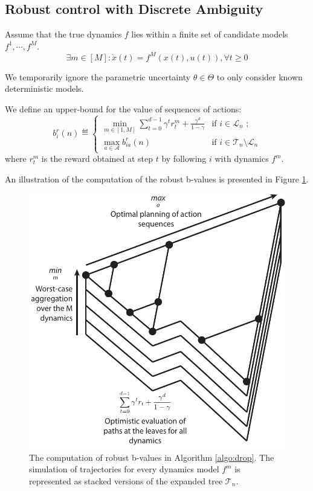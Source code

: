 \documentclass{article}
\begin{document}
\subsection{Robust control with Discrete Ambiguity}


\begin{assumption}
Assume that the true dynamics $f$ lies within a finite set of candidate models $f^1, \cdots, f^M$.
\begin{equation}
\exists m\in[M]: \dot{x}(t) = f^M(x(t), u(t)), \forall t\geq 0
\end{equation}

We temporarily ignore the parametric uncertainty $\theta\in\Theta$ to only consider known deterministic models.
\end{assumption}

\begin{definition} We define an upper-bound for the value of sequences of actions:
\begin{equation}
\label{eq:robust_sequence_ucb}
b_i^r(n)  \eqdef
\begin{cases}
\min_{m\in[1, M]} \sum_{t=0}^{d-1} \gamma^t r_t^m  + \frac{\gamma^d}{1-\gamma} &\text{if } i \in \mathcal{L}_n \text{ ;}\\
\max_{a\in\mathcal{A}} b_{ia}^r(n) & \text{if } i \in \mathcal{T}_n \setminus \mathcal{L}_n 
\end{cases}
\end{equation}
where $r_t^m$ is the reward obtained at step $t$ by following $i$ with dynamics $f^m$.
\end{definition}
An illustration of the computation of the robust b-values is presented in Figure \ref{fig:drop}.

\begin{figure}
\centering
\includegraphics[width=0.4\linewidth]{img/robust-control-tree}
\caption{The computation of robust b-values in Algorithm \ref{algo:drop}. The simulation of trajectories for every dynamics model $f^m$ is represented as stacked versions of the expanded tree $\mathcal{T}_n$.}
\label{fig:drop}
\end{figure}
\end{document}
